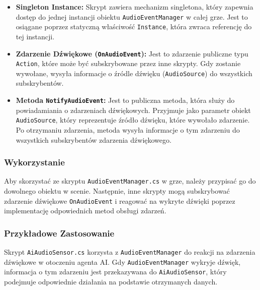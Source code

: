 \begin{itemize}
    \item \textbf{Singleton Instance:} Skrypt zawiera mechanizm singletona, który zapewnia dostęp do jednej instancji obiektu \texttt{AudioEventManager} w całej grze. Jest to osiągane poprzez statyczną właściwość \texttt{Instance}, która zwraca referencję do tej instancji.
    
    \item \textbf{Zdarzenie Dźwiękowe (\texttt{OnAudioEvent}):} Jest to zdarzenie publiczne typu \texttt{Action}, które może być subskrybowane przez inne skrypty. Gdy zostanie wywołane, wysyła informacje o źródle dźwięku (\texttt{AudioSource}) do wszystkich subskrybentów.
    
    \item \textbf{Metoda \texttt{NotifyAudioEvent}:} Jest to publiczna metoda, która służy do powiadamiania o zdarzeniach dźwiękowych. Przyjmuje jako parametr obiekt \texttt{AudioSource}, który reprezentuje źródło dźwięku, które wywołało zdarzenie. Po otrzymaniu zdarzenia, metoda wysyła informacje o tym zdarzeniu do wszystkich subskrybentów zdarzenia dźwiękowego.
\end{itemize}

\subsubsection{Wykorzystanie}

Aby skorzystać ze skryptu \texttt{AudioEventManager.cs} w grze, należy przypisać go do dowolnego obiektu w scenie. Następnie, inne skrypty mogą subskrybować zdarzenie dźwiękowe \texttt{OnAudioEvent} i reagować na wykryte dźwięki poprzez implementację odpowiednich metod obsługi zdarzeń.

\subsubsection{Przykładowe Zastosowanie}

Skrypt \texttt{AiAudioSensor.cs} korzysta z \texttt{AudioEventManager} do reakcji na zdarzenia dźwiękowe w otoczeniu agenta AI. Gdy \texttt{AudioEventManager} wykryje dźwięk, informacja o tym zdarzeniu jest przekazywana do \texttt{AiAudioSensor}, który podejmuje odpowiednie działania na podstawie otrzymanych danych.